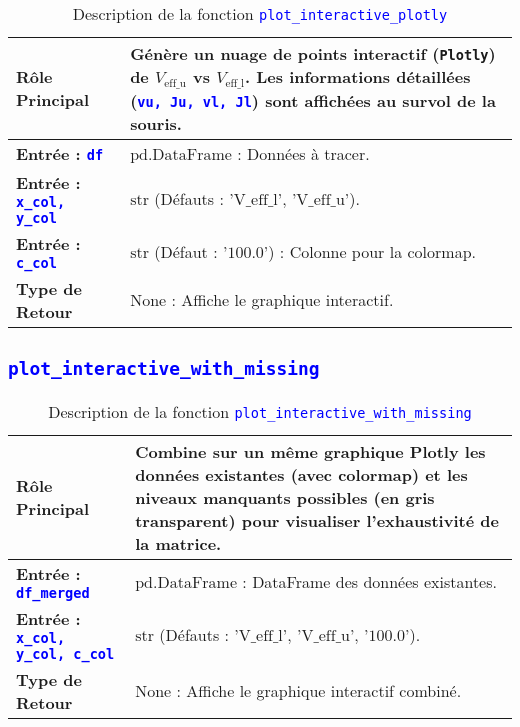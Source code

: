 \documentclass{article}
\newcommand{\code}[1]{\texttt{\textcolor{blue}{#1}}}
\begin{document}
\begin{longtable}{|>{\raggedright\arraybackslash}p{}|>{\raggedright\arraybackslash}p{}|}
    \caption{Description de la fonction \code{plot\_interactive\_plotly}} \\
    \toprule
    \textbf{Rôle Principal} & Génère un nuage de points \textbf{interactif} (\texttt{Plotly}) de $V_{\text{eff\_u}}$ vs $V_{\text{eff\_l}}$. Les informations détaillées (\code{vu, Ju, vl, Jl}) sont affichées au survol de la souris. \\
    \midrule
    \textbf{Entrée : \code{df}} & $\text{pd.DataFrame}$ : Données à tracer. \\
    \midrule
    \textbf{Entrée : \code{x\_col, y\_col}} & $\text{str}$ (Défauts : $\text{'V\_eff\_l', 'V\_eff\_u'}$). \\
    \midrule
    \textbf{Entrée : \code{c\_col}} & $\text{str}$ (Défaut : $\text{'100.0'}$) : Colonne pour la colormap. \\
    \midrule
    \textbf{Type de Retour} & $\text{None}$ : Affiche le graphique interactif. \\
    \bottomrule
\end{longtable}

\subsection{\code{plot\_interactive\_with\_missing}}

\begin{longtable}{|>{\raggedright\arraybackslash}p{}|>{\raggedright\arraybackslash}p{}|}
    \caption{Description de la fonction \code{plot\_interactive\_with\_missing}} \\
    \toprule
    \textbf{Rôle Principal} & Combine sur un même graphique Plotly les \textbf{données existantes} (avec colormap) et les \textbf{niveaux manquants possibles} (en gris transparent) pour visualiser l'exhaustivité de la matrice. \\
    \midrule
    \textbf{Entrée : \code{df\_merged}} & $\text{pd.DataFrame}$ : DataFrame des données existantes. \\
    \midrule
    \textbf{Entrée : \code{x\_col, y\_col, c\_col}} & $\text{str}$ (Défauts : $\text{'V\_eff\_l', 'V\_eff\_u', '100.0'}$). \\
    \midrule
    \textbf{Type de Retour} & $\text{None}$ : Affiche le graphique interactif combiné. \\
    \bottomrule
\end{longtable}
\end{document}
